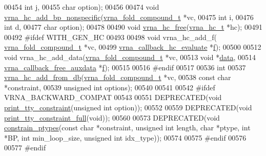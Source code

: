 \begin{DoxyCode}
00454                     \textcolor{keywordtype}{int} j,
00455                     \textcolor{keywordtype}{char} option);
00456 
00474 \textcolor{keywordtype}{void} \hyperlink{group__hard__constraints_gadeb1083d0dc928e1e931065aae54ad82}{vrna\_hc\_add\_bp\_nonspecific}(\hyperlink{group__fold__compound_structvrna__fc__s}{vrna\_fold\_compound\_t} *vc,
00475                                 \textcolor{keywordtype}{int} i,
00476                                 \textcolor{keywordtype}{int} d,
00477                                 \textcolor{keywordtype}{char} option);
00478 
00490 \textcolor{keywordtype}{void} \hyperlink{group__hard__constraints_ga696dcf77887d856c6f21ea266d8b9ca2}{vrna\_hc\_free}(\hyperlink{group__hard__constraints_structvrna__hc__s}{vrna\_hc\_t} *hc);
00491 
00492 \textcolor{preprocessor}{#ifdef WITH\_GEN\_HC}
00493 
00498 \textcolor{keywordtype}{void} vrna\_hc\_add\_f( \hyperlink{group__fold__compound_structvrna__fc__s}{vrna\_fold\_compound\_t} *vc,
00499                     \hyperlink{group__hard__constraints_ga16eb71ac9a7a35369be2eaa9d8f8dfa0}{vrna\_callback\_hc\_evaluate} *\hyperlink{group__hard__constraints_a85714afbf27012165ec80c564bd62931}{f});
00500 
00512 \textcolor{keywordtype}{void} vrna\_hc\_add\_data(\hyperlink{group__fold__compound_structvrna__fc__s}{vrna\_fold\_compound\_t} *vc,
00513                       \textcolor{keywordtype}{void} *\hyperlink{group__hard__constraints_acef3d722142cb5f4a8e114e5fbce3b1a}{data},
00514                       \hyperlink{group__fold__compound_ga3ae51bfd5fc3236652d1de4e3274b49b}{vrna\_callback\_free\_auxdata} *\hyperlink{group__hard__constraints_a85714afbf27012165ec80c564bd62931}{f});
00515 
00516 \textcolor{preprocessor}{#endif}
00517 
00536 \textcolor{keywordtype}{int}
00537 \hyperlink{group__hard__constraints_ga5b4de3247b67358080c176b94591a8e6}{vrna\_hc\_add\_from\_db}(\hyperlink{group__fold__compound_structvrna__fc__s}{vrna\_fold\_compound\_t} *vc,
00538                     \textcolor{keyword}{const} \textcolor{keywordtype}{char} *constraint,
00539                     \textcolor{keywordtype}{unsigned} \textcolor{keywordtype}{int} options);
00540 
00541 
00542 \textcolor{preprocessor}{#ifdef  VRNA\_BACKWARD\_COMPAT}
00543 
00551 DEPRECATED(\textcolor{keywordtype}{void} \hyperlink{constraints__hard_8h_a4d167deb70bb51723e44374dc981deb2}{print\_tty\_constraint}(\textcolor{keywordtype}{unsigned} \textcolor{keywordtype}{int} option));
00552 
00559 DEPRECATED(\textcolor{keywordtype}{void} \hyperlink{constraints__hard_8h_ae8ae8a34962b9959be3f6c40f0a80ac1}{print\_tty\_constraint\_full}(\textcolor{keywordtype}{void}));
00560 
00573 DEPRECATED(\textcolor{keywordtype}{void} \hyperlink{constraints__hard_8h_a36c3a6c3218b041f992052767bc74549}{constrain\_ptypes}(\textcolor{keyword}{const} \textcolor{keywordtype}{char} *constraint, \textcolor{keywordtype}{unsigned} \textcolor{keywordtype}{int} length, \textcolor{keywordtype}{char} *ptype, \textcolor{keywordtype}{
      int} *BP, \textcolor{keywordtype}{int} min\_loop\_size, \textcolor{keywordtype}{unsigned} \textcolor{keywordtype}{int} idx\_type));
00574 
00575 \textcolor{preprocessor}{#endif}
00576 
00577 \textcolor{preprocessor}{#endif}
\end{DoxyCode}
